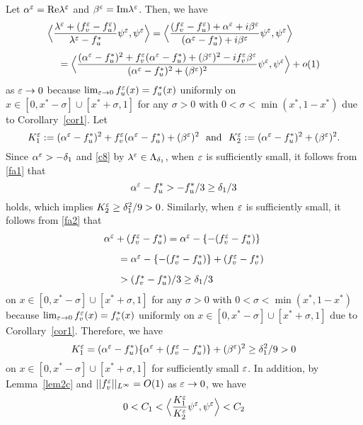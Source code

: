 \documentclass[a4,10pt]{article}
\begin{document}
Let $\alpha^\varepsilon = \text{Re} \lambda^\varepsilon$ and $\beta^\varepsilon = \text{Im} \lambda^\varepsilon$. Then, we have
%
$$
\begin{array}{l}
\Big{\lg} \dis\frac{\lambda^\ep + (f_v^\ep - f_u^\ep )}{\lambda^\ep - f_u^*}\psi^\ep, \psi^\ep \Big{\rg}
=
\Big{\lg} \dis\frac{ (f_v^\ep - f_u^\ep ) + \alpha^\ep + i \beta^\ep}{(\alpha^\ep - f_u^*) + i \beta^\ep}\psi^\ep, \psi^\ep \Big{\rg} \\[3ex]
\ \ \ \ 
=
\Big{\lg} \dis\frac{ (\alpha^\ep - f_u^* )^2 +  f^\ep_v (\alpha^\ep - f_u^* ) + (\beta^\ep)^2
- i  f^\ep_v \beta^\ep}{(\alpha^\ep - f_u^*)^2 + (\beta^\ep)^2}\psi^\ep, \psi^\ep \Big{\rg} + o(1)
\end{array}
$$
%
as $\varepsilon \to 0$ because $\lim_{\varepsilon \to 0} f_u^\varepsilon(x) = f_u^*(x)$ uniformly on 
$x \in [0, x^* - \sigma] \cup [x^* + \sigma, 1]$ for any 
$\sigma > 0$ with $ 0 < \sigma < \min(x^*, 1-x^*)$ due to Corollary~\ref{cor1}.
Let 
$$
K^\varepsilon_1 :=  (\alpha^\varepsilon - f_u^* )^2 +  f^\varepsilon_v (\alpha^\varepsilon - f_u^* ) + (\beta^\varepsilon)^2 \ \
\text{and} \ \  K^\varepsilon_2 := (\alpha^\varepsilon - f_u^*)^2 + (\beta^\varepsilon)^2. 
$$
%
Since $\alpha^\varepsilon > -\delta_1$ and \eqref{c8} by $\lambda^\varepsilon \in \Lambda_{\delta_1}$, when $\varepsilon$ is sufficiently small, it follows from \eqref{fa1} that 
%
$$
\alpha^\varepsilon - f_u^* > -  f_u^*/3 \geq \delta_1/3
$$
%
holds, which implies 
$K^\varepsilon_2 \geq \delta_1^2/9 > 0$.
Similarly, when $\varepsilon$ is sufficiently small, it follows from \eqref{fa2} that 
$$
\begin{array}{l}
 \alpha^\varepsilon + (f_v^\varepsilon - f_u^* ) =  \alpha^\varepsilon - \{ - (f_v^\varepsilon - f_u^*) \} 
\\[2ex]
\ \ \ \ \ = 
 \alpha^\varepsilon - \{ - (f_v^* - f_u^*) \} + (f_v^\varepsilon - f_v^*)
\\[2ex]
\ \ \ \ \  > (f_v^* - f_u^* )/3 \geq \delta_1/3
\end{array}
$$
on $x \in [0, x^* - \sigma] \cup [x^* + \sigma, 1]$ 
for any $\sigma > 0$ with $ 0 < \sigma < \min(x^*, 1-x^*)$
because 
$\lim_{\varepsilon \to 0} f_v^\varepsilon(x) = f_v^*(x)$ uniformly on 
$x \in [0, x^* - \sigma] \cup [x^* + \sigma, 1]$  due to Corollary~\ref{cor1}.
Therefore, we have 
$$
K^\varepsilon_1 = (\alpha^\varepsilon - f_u^* ) \{ \alpha^\varepsilon + (f_v^\varepsilon - f_u^* ) \} + (\beta^\varepsilon)^2 \geq \delta_1^2/9 > 0
$$ 
on $x \in [0, x^* - \sigma] \cup [x^* + \sigma, 1]$ for sufficiently small $\varepsilon$.
In addition, by Lemma~\ref{lem2c} and $|| f_v^\varepsilon ||_{L^\infty} = O(1)$ as
$\varepsilon \to 0$, we have
%
\begin{equation}\label{c13x}
0 < C_1 < \Big{\langle} \frac{K_1^\varepsilon }{K_2^\varepsilon}\psi^\varepsilon, \psi^\varepsilon \Big{\rangle} < C_2
\end{equation}
\end{document}
